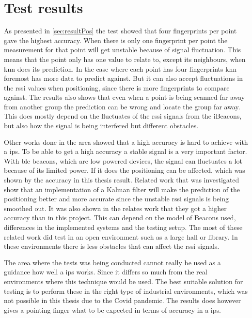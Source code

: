 \section{Test results}\label{sec:discussionResult}
As presented in \cref{sec:resultPos} the test showed that four fingerprints per point gave the highest accuracy.
When there is only one fingerprint per point the measurement for that point will get unstable because of signal fluctuation.
This means that the point only has one value to relate to, except its neighbours, when \acrshort{knn} does its prediction.
In the case where each point has four fingerprints \acrshort{knn} foremost has more data to predict against.
But it can also accept fluctuations in the \acrshort{rssi} values when positioning, since there is more fingerprints to compare against.
The results also shows that even when a point is being scanned far away from another group the prediction can be wrong and locate the group far away.
This does mostly depend on the fluctuates of the \acrshort{rssi} signals from the iBeacons, but also how the signal is being interfered but different obstacles.

\bigskip

Other works done in the area showed that a high accuracy is hard to achieve with a \acrshort{ips}.
To be able to get a high accuracy a stable signal is a very important factor.
With \acrshort{ble} beacons, which are low powered devices, the signal can fluctuates a lot because of its limited power.
If it does the positioning can be affected, which was shown by the accuracy in this thesis result.
Related work that was investigated show that an implementation of a Kalman filter will make the prediction of the positioning better and more accurate since the unstable \acrshort{rssi} signals is being smoothed out.
It was also shown in the relates work that they got a higher accuracy than in this project.
This can depend on the model of Beacons used, differences in the implemented systems and the testing setup.
The most of these related work did test in an open environment such as a large hall or library.
In these environments there is less obstacles that can affect the \acrshort{rssi} signals.

\bigskip

The area where the tests was being conducted cannot really be used as a guidance how well a \acrshort{ips} works.
Since it differs so much from the real environments where this technique would be used.
The best suitable solution for testing is to perform these in the right type of industrial environments, which was not possible in this thesis due to the Covid pandemic.
The results does however gives a pointing finger what to be expected in terms of accuracy in a \acrshort{ips}.


